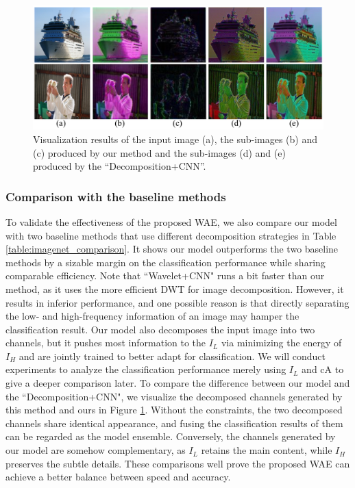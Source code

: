 \documentclass[letterpaper]{article} %
\begin{document}
\begin{figure}[htbp]
\centering
\includegraphics[width=0.90\linewidth]{visualization_comparison.pdf}
\caption{Visualization results of the input image (a), the sub-images (b) and (c) produced by our method and the sub-images (d) and (e) produced by the ``Decomposition+CNN''.}
\label{fig:visualization_comparison}
\end{figure}

\subsubsection{Comparison with the baseline methods}
To validate the effectiveness of the proposed WAE, we also compare our model with two baseline methods that use different decomposition strategies in Table \ref{table:imagenet_comparison}. It shows our model outperforms the two baseline methods by a sizable margin on the classification performance while sharing comparable efficiency. Note that ``Wavelet+CNN" runs a bit faster than our method, as it uses the more efficient DWT for image decomposition. However, it results in inferior performance, and one possible reason is that directly separating the low- and high-frequency information of an image may hamper the classification result. Our model also decomposes the input image into two channels, but it pushes most information to the $I_L$ via minimizing the energy of $I_H$ and are jointly trained to better adapt for classification. We will conduct experiments to analyze the classification performance merely using $I_L$ and cA to give a deeper comparison later. To compare the difference between our model and the ``Decomposition+CNN", we visualize the decomposed channels generated by this method and ours in Figure \ref{fig:visualization_comparison}. Without the constraints, the two decomposed channels share identical appearance, and fusing the classification results of them can be regarded as the model ensemble. Conversely, the channels generated by our model are somehow complementary, as $I_L$ retains the main content, while $I_H$ preserves the subtle details. These comparisons well prove the proposed WAE can achieve a better balance between speed and accuracy.
\end{document}
